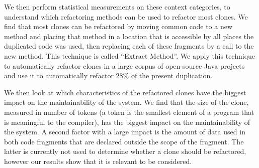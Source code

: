 We then perform statistical measurements on these context categories, to understand which refactoring methods can be used to refactor most clones. We find that most clones can be refactored by moving common code to a new method and placing that method in a location that is accessible by all places the duplicated code was used, then replacing each of these fragments by a call to the new method. This technique is called ``Extract Method''. We apply this technique to automatically refactor clones in a large corpus of open-source Java projects and use it to automatically refactor 28\% of the present duplication.

We then look at which characteristics of the refactored clones have the biggest impact on the maintainability of the system. We find that the size of the clone, measured in number of tokens (a token is the smallest element of a program that is meaningful to the compiler), has the biggest impact on the maintainability of the system. A second factor with a large impact is the amount of data used in both code fragments that are declared outside the scope of the fragment. The latter is currently not used to determine whether a clone should be refactored, however our results show that it is relevant to be considered.



